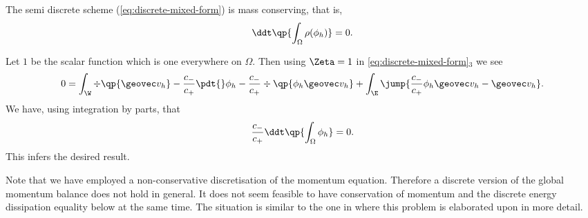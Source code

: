 \documentclass[final]{amsart}
\numberwithin{equation}{section}
\begin{document}
\begin{Pro}  
  \label{pro:cons-of-mass-space}
  The semi discrete scheme (\ref{eq:discrete-mixed-form}) is mass conserving, that is,
  \begin{equation}
    \ddt \qp{\int_\Omega \rho(\phi_h)} =0.
  \end{equation}
\end{Pro}
\begin{Proof}
  Let $1$ be the scalar function which is one everywhere on $\Omega$.
  Then using  $\Zeta= 1$ in \eqref{eq:discrete-mixed-form}$_3$ we see
  \begin{equation}
    0 = 
    \int_\W 
    \div\qp{\geovec v_h} 
    -
    \frac{c_-}{c_+}\pdt{}\phi_h 
    -
    \frac{c_-}{c_+} \div\qp{\phi_h\geovec v_h} 
    +
    \int_\E \jump{\frac{c_-}{c_+}\phi_h\geovec v_h - \geovec v_h}.
  \end{equation}
  We have, using integration by parts, that
  \begin{equation}
    \frac{c_-}{c_+}\ddt \qp{\int_\Omega \phi_h} =0.
  \end{equation}
  This infers the desired result.
\end{Proof}
\begin{Rem}
Note that we have employed a non-conservative discretisation of the momentum equation. Therefore a discrete version of the global momentum balance does not hold in general.
It does not seem feasible to have conservation of momentum and the discrete energy dissipation equality below at the same time.
The situation is similar to the one in \cite{GiesselmannMakridakisPryer:2012} where this problem is elaborated upon in more detail.
\end{Rem}
\end{document}
